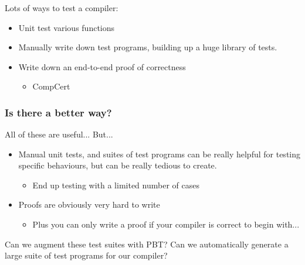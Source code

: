 \documentclass{beamer}
\begin{document}
\begin{frame}
  \frametitle{}

  Lots of ways to test a compiler:

  \begin{itemize}
  \item Unit test various functions
  \item Manually write down test programs, building up a huge library
    of tests.
  \item Write down an end-to-end proof of correctness
    \begin{itemize}
    \item CompCert
    \end{itemize}
  \end{itemize}


\end{frame}

\begin{frame}
  \frametitle{Is there a better way?}

  All of these are useful... But...
  
  \begin{itemize}
  \item Manual unit tests, and suites of test programs can be really
    helpful for testing specific behaviours, but can be really tedious
    to create.
    \begin{itemize}
    \item End up testing with a limited number of cases
    \end{itemize}
  \item Proofs are obviously very hard to write
    \begin{itemize}
    \item Plus you can only write a proof if your compiler is correct
      to begin with... %
    \end{itemize}
  \end{itemize}

  Can we augment these test suites with PBT? Can we automatically
  generate a large suite of test programs for our compiler?

\end{frame}
\end{document}
